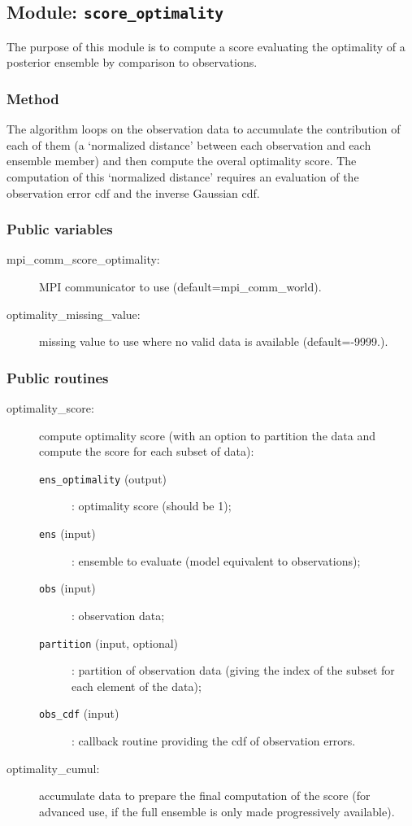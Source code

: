 \documentclass[11pt]{article}
\begin{document}
\subsection{Module: {\tt\bf score\_optimality}}

The purpose of this module is to compute a score
evaluating the optimality of a posterior ensemble
by comparison to observations.

\subsubsection*{Method}

The algorithm loops on the observation data
to accumulate the contribution of each of them
(a `normalized distance' between each observation and each ensemble member)
and then compute the overal optimality score.
The computation of this `normalized distance' requires an evaluation
of the observation error cdf and the inverse Gaussian cdf.

\subsubsection*{Public variables}

\begin{description}
\item[mpi\_comm\_score\_optimality:] MPI communicator to use (default=mpi\_comm\_world).
\item[optimality\_missing\_value:] missing value to use where no valid data is available (default=-9999.).
\end{description}

\subsubsection*{Public routines}

\begin{description}
\item[optimality\_score:] compute optimality score (with an option to partition the data
                    and compute the score for each subset of data):
  \begin{description}
  \item[{\tt ens\_optimality} (output)]: optimality score (should be 1);
  \item[{\tt ens} (input)]: ensemble to evaluate (model equivalent to observations);
  \item[{\tt obs} (input)]: observation data;
  \item[{\tt partition} (input, optional)]: partition of observation data
                                  (giving the index of the subset for each element of the data);
  \item[{\tt obs\_cdf} (input)]: callback routine providing the cdf of observation errors.
  \end{description}
\item[optimality\_cumul:] accumulate data to prepare the final computation of the score
                    (for advanced use, if the full ensemble is only made progressively available).
\end{description}
\end{document}
